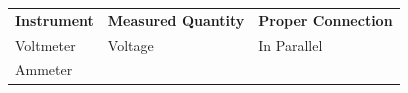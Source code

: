 {{\begin{center}
\begin{xtabular}[t]{|l|l|l|}
    
        
                  \textbf{Instrument}
                 &
    
    
        
                  \textbf{Measured Quantity}
                 &
    
    
        
                  \textbf{Proper Connection}
     \tabularnewline{}
    
    
        Voltmeter &
    
    
        Voltage &
    
    
        In Parallel%
     \tabularnewline{}
    
    
        Ammeter &
    
    

\end{xtabular}
\end{center}}}
